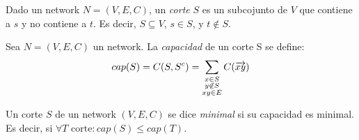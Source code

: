 \begin{definition}
  Dado un network $N = (V, E, C)$, un \emph{corte} $S$ es un subcojunto de $V$
  que contiene a $s$ y no contiene a $t$. Es decir, $S \subseteq V$,
  $s \in S$, y $t \not\in S$.
\end{definition}

\begin{definition}
  Sea $N = (V, E, C)$ un network. La \emph{capacidad} de un corte S se define:
  \begin{align}
    cap(S) = C(S, S^c) = \sum_{\substack{x\in S \\ y \not\in S \\ xy \in E}} C(\overrightarrow{xy})
  \end{align}
\end{definition}

\begin{definition}
  Un corte $S$ de un network $(V, E, C)$ se dice \emph{minimal} si su
  capacidad es minimal. Es decir, si
  $\forall T \text{ corte} \colon cap(S) \le cap(T)$.
\end{definition}
